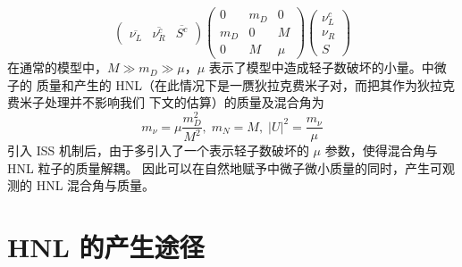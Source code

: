 \documentclass[printMode=false, declarePage=false]{ecnuthesis}
\begin{document}
\begin{equation}
  \begin{pmatrix}
    \overline{\nu_L} & \overline{\nu_R^c} & \overline{S^c}
  \end{pmatrix}
  \begin{pmatrix}
    0   & m_D & 0    \\
    m_D & 0   & M    \\
    0   & M   & \mu
  \end{pmatrix}
  \begin{pmatrix}
    \nu_L^c \\
    \nu_R   \\
    S
  \end{pmatrix}
\end{equation}
在通常的模型中，$M \gg m_D \gg \mu$，$\mu$ 表示了模型中造成轻子数破坏的小量。中微子的
质量和产生的 HNL（在此情况下是一赝狄拉克费米子对，而把其作为狄拉克费米子处理并不影响我们
下文的估算）的质量及混合角为 \cite{king2025righthandedneutrinosseesawmodels}
\begin{equation}
  m_\nu = \mu \frac{m_D^2}{M^2}, \; m_N = M, \; |U|^2 = \frac{m_\nu}{\mu}
\end{equation}
引入 ISS 机制后，由于多引入了一个表示轻子数破坏的 $\mu$ 参数，使得混合角与 HNL 粒子的质量解耦。
因此可以在自然地赋予中微子微小质量的同时，产生可观测的 HNL 混合角与质量。

\section{HNL 的产生途径}
\end{document}
